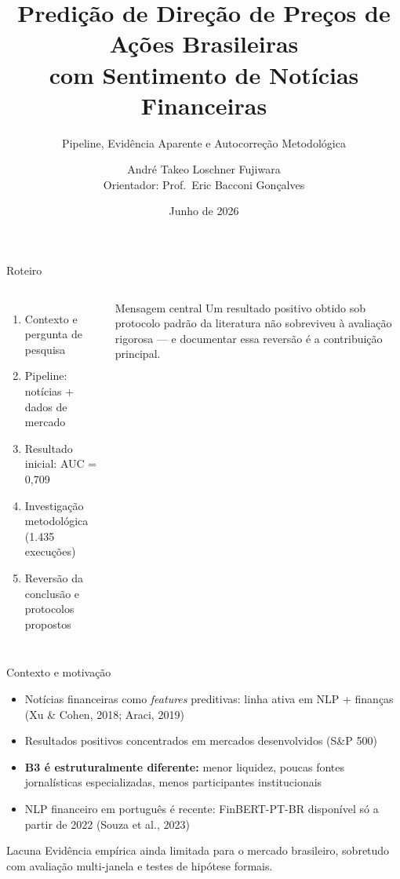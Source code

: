 \documentclass[10pt,aspectratio=169]{beamer}
\title[Sentimento de Notícias e Predição na B3]{Predição de Direção de Preços de Ações Brasileiras\\com Sentimento de Notícias Financeiras}
\subtitle{Pipeline, Evidência Aparente e Autocorreção Metodológica}
\author[André Takeo L. Fujiwara]{André Takeo Loschner Fujiwara\\[1ex]{\small Orientador: Prof.\ Eric Bacconi Gonçalves}}
\institute[PUC-SP]{Ciência de Dados e Inteligência Artificial --- PUC-SP}
\date{Junho de 2026}
\begin{document}
\begin{frame}[plain]
  \titlepage
\end{frame}

\begin{frame}{Roteiro}
  \begin{columns}[T]
    \begin{enumerate}
      \item Contexto e pergunta de pesquisa
      \item Pipeline: notícias + dados de mercado
      \item Resultado inicial: AUC = 0{,}709
      \item Investigação metodológica (1.435 execuções)
      \item Reversão da conclusão e protocolos propostos
    \end{enumerate}
    \begin{block}{Mensagem central}
      Um resultado positivo obtido sob protocolo padrão da literatura
      \alert{não sobreviveu} à avaliação rigorosa --- e documentar essa
      reversão é a contribuição principal.
    \end{block}
  \end{columns}
\end{frame}

\begin{frame}{Contexto e motivação}
  \begin{itemize}
    \item Notícias financeiras como \textit{features} preditivas: linha ativa em NLP + finanças (Xu \& Cohen, 2018; Araci, 2019)
    \item Resultados positivos concentrados em mercados desenvolvidos (S\&P 500)
    \item \textbf{B3 é estruturalmente diferente:} menor liquidez, poucas fontes jornalísticas especializadas, menos participantes institucionais
    \item NLP financeiro em português é recente: FinBERT-PT-BR disponível só a partir de 2022 (Souza et al., 2023)
  \end{itemize}
  \vspace{1ex}
  \begin{block}{Lacuna}
    Evidência empírica ainda limitada para o mercado brasileiro, sobretudo
    com avaliação multi-janela e testes de hipótese formais.
  \end{block}
\end{frame}
\end{document}
